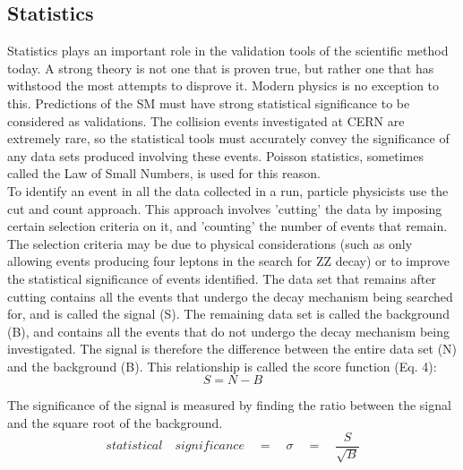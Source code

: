 \documentclass[runningheads,a4paper]{llncs}
\begin{document}


\subsection{Statistics}

Statistics plays an important role in the validation tools of the scientific method today. A strong theory is not one that is proven true, but rather one that has withstood the most attempts to disprove it. Modern physics is no exception to this. Predictions of the SM must have strong statistical significance to be considered as validations. The collision events investigated at CERN are extremely rare, so the statistical tools must accurately convey the significance of any data sets produced involving these events. Poisson statistics, sometimes called the Law of Small Numbers, is used for this reason.\\

To identify an event in all the data collected in a run, particle physicists use the cut and count approach. This approach involves 'cutting' the data by imposing certain selection criteria on it, and 'counting' the number of events that remain. The selection criteria may be due to physical considerations (such as only allowing events producing four leptons in the search for ZZ decay) or to improve the statistical significance of events identified. The data set that remains after cutting contains all the events that undergo the decay mechanism being searched for, and is called the signal (S). The remaining data set is called the background (B), and contains all the events that do not undergo the decay mechanism being investigated. The signal is therefore the difference between the entire data set (N) and the background (B). This relationship is called the score function (Eq. 4):\\

\begin{equation}
S = N - B
\end{equation}

The significance of the signal is measured by finding the ratio between the signal and the square root of the background. \\

\begin{equation}
statistical\quad significance\quad = \quad \sigma \quad = \quad \frac { S }{ \sqrt { B }  } 
\end{equation}
\end{document}
